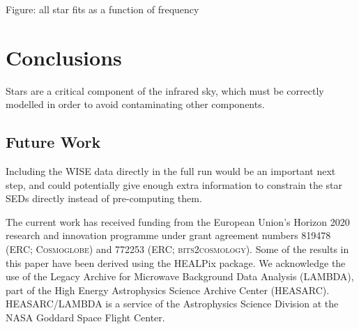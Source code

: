 \documentclass{aa}
\begin{document}
Figure: all star fits as a function of frequency 

\clearpage
\section{Conclusions}
\label{sec:conclusions}

Stars are a critical component of the infrared sky, which must be correctly modelled in order to avoid contaminating other components. 

\subsection{Future Work}

Including the WISE data directly in the full run would be an important next step, and could potentially give enough extra information to constrain the star SEDs directly instead of pre-computing them. 




\begin{acknowledgements}
 The current work has received funding from the European
  Union’s Horizon 2020 research and innovation programme under grant
  agreement numbers 819478 (ERC; \textsc{Cosmoglobe}) and 772253 (ERC;
  \textsc{bits2cosmology}). Some of the results in this paper have been derived using the HEALPix \citep{HEALPIX} package.
  We acknowledge the use of the Legacy Archive for Microwave Background Data
  Analysis (LAMBDA), part of the High Energy Astrophysics Science Archive Center
  (HEASARC). HEASARC/LAMBDA is a service of the Astrophysics Science Division at
  the NASA Goddard Space Flight Center.  
\end{acknowledgements}


%



\end{document}
